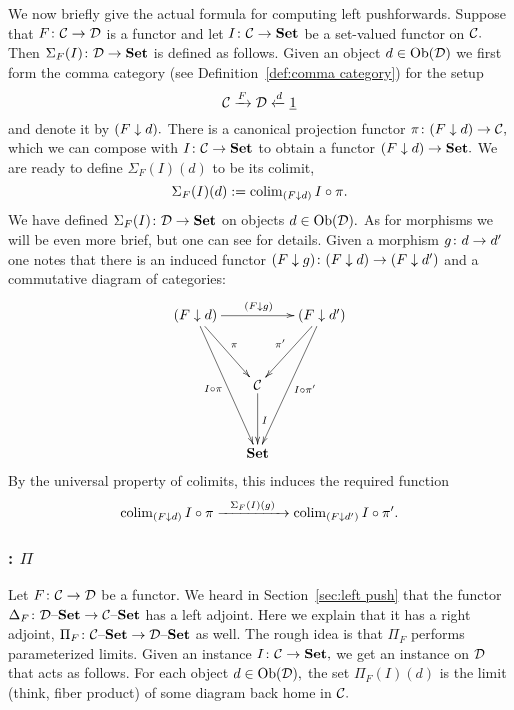 \documentclass[../main/CT4S-EN-RU]{subfiles}
\begin{document}
\begin{exerciseRUS}
\end{exerciseRUS}

\begin{blockENG}
We now briefly give the actual formula for computing left pushforwards. Suppose that $F\colon\mathcal{C}\rightarrow\mathcal{D}$ is a functor and let $I\colon\mathcal{C}\rightarrow{\mathbf{Set}}$ be a set-valued functor on $\mathcal{C}.$ Then $\Sigma_F(I)\colon\mathcal{D}\rightarrow{\mathbf{Set}}$ is defined as follows. Given an object $d\in\operatorname{Ob}(\mathcal{D})$ we first form the comma category (see Definition~\ref{def:comma category}) for the setup
$$\mathcal{C}\xrightarrow{F}\mathcal{D}\xleftarrow{d}\underline{1}$$
and denote it by $(F\downarrow d).$ There is a canonical projection functor $\pi\colon(F\downarrow d)\rightarrow\mathcal{C},$ which we can compose with $I\colon\mathcal{C}\rightarrow{\mathbf{Set}}$ to obtain a functor $(F\downarrow d)\rightarrow{\mathbf{Set}}.$ We are ready to define $\Sigma_F(I)(d)$ to be its colimit,
$$\Sigma_F(I)(d):=\operatorname{colim}_{(F\downarrow d)}I\circ\pi.$$
We have defined $\Sigma_F(I)\colon\mathcal{D}\rightarrow{\mathbf{Set}}$ on objects $d\in\operatorname{Ob}(\mathcal{D}).$ As for morphisms we will be even more brief, but one can see \cite{Sp1} for details. Given a morphism $g\colon d\rightarrow d'$ one notes that there is an induced functor $(F\downarrow g)\colon (F\downarrow d)\rightarrow(F\downarrow d')$ and a commutative diagram of categories:
$$
\xymatrix@=15pt{
(F\down d)\ar[rr]^{(F\down g)}\ar[ddr]^{\pi}\ar[ddddr]_{I\circ\pi}&&(F\down d')\ar[ddl]_{\pi'}\ar[ddddl]^{I\circ\pi'}\\\\
&\mcC\ar[dd]^I\\\\
&\Set
}
$$
By the universal property of colimits, this induces the required function $$\operatorname{colim}_{(F\downarrow d)}I\circ\pi\xrightarrow{\ \ \Sigma_F(I)(g)\ \ }\operatorname{colim}_{(F\downarrow d')}I\circ\pi'.$$
\end{blockENG}

\begin{blockRUS}
\end{blockRUS}


\subsubsection{: \texorpdfstring{$\Pi$}{Π}}

\begin{blockENG}
Let $F\colon\mathcal{C}\rightarrow\mathcal{D}$ be a functor. We heard in Section~\ref{sec:left push} that the functor $\Delta_F\colon\mathcal{D}{\text \textendash}{\mathbf{Set}}\rightarrow\mathcal{C}{\text \textendash}{\mathbf{Set}}$ has a left adjoint. Here we explain that it has a right adjoint, $\Pi_F\colon\mathcal{C}{\text \textendash}{\mathbf{Set}}\rightarrow\mathcal{D}{\text \textendash}{\mathbf{Set}}$ as well. The rough idea is that $\Pi_F$ performs parameterized limits. Given an instance $I\colon\mathcal{C}\rightarrow{\mathbf{Set}},$ we get an instance on $\mathcal{D}$ that acts as follows. For each object $d\in\operatorname{Ob}(\mathcal{D}),$ the set $\Pi_F(I)(d)$ is the limit (think, fiber product) of some diagram back home in $\mathcal{C}.$ 
\end{blockENG}
\end{document}

